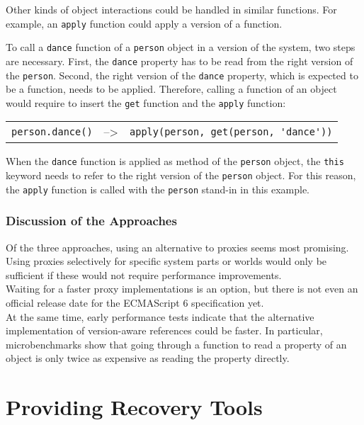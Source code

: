 Other kinds of object interactions could be handled in similar functions.
For example, an \lstinline{apply} function could apply a version of a function.

To call a \lstinline{dance} function of a \lstinline{person} object in a version of the system, two steps are necessary.
First, the \lstinline{dance} property has to be read from the right version of the \lstinline{person}.
Second, the right version of the \lstinline{dance} property, which is expected to be a function, needs to be applied.
Therefore, calling a function of an object would require to insert the \lstinline{get} function and the \lstinline{apply} function:

\begin{center}
    \begin{tabular}{ lll }
    \lstinline|person.dance()| & --> & \lstinline|apply(person, get(person, 'dance'))| \\
    \end{tabular}
\end{center}

When the \lstinline{dance} function is applied as method of the \lstinline{person} object, the \lstinline{this} keyword needs to refer to the right version of the \lstinline{person} object.
For this reason, the \lstinline{apply} function is called with the \lstinline{person} stand-in in this example.

\subsubsection{Discussion of the Approaches}

Of the three approaches, using an alternative to proxies seems most promising.\\
Using proxies selectively for specific system parts or worlds would only be sufficient if these would not require performance improvements.\\
Waiting for a faster proxy implementations is an option, but there is not even an official release date for the ECMAScript 6 specification yet.\\
At the same time, early performance tests indicate that the alternative implementation of version-aware references could be faster.
In particular, microbenchmarks show that going through a function to read a property of an object is only twice as expensive as reading the property directly.


\section{Providing Recovery Tools}

